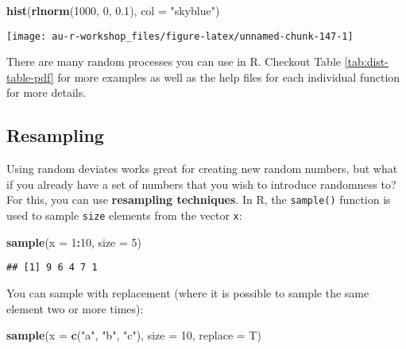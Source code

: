 \documentclass[]{book}
\newenvironment{Shaded}{\begin{snugshade}}{\end{snugshade}}
\newcommand{\KeywordTok}[1]{\textcolor[rgb]{0.13,0.29,0.53}{\textbf{#1}}}
\newcommand{\DataTypeTok}[1]{\textcolor[rgb]{0.13,0.29,0.53}{#1}}
\newcommand{\DecValTok}[1]{\textcolor[rgb]{0.00,0.00,0.81}{#1}}
\newcommand{\FloatTok}[1]{\textcolor[rgb]{0.00,0.00,0.81}{#1}}
\newcommand{\StringTok}[1]{\textcolor[rgb]{0.31,0.60,0.02}{#1}}
\newcommand{\OperatorTok}[1]{\textcolor[rgb]{0.81,0.36,0.00}{\textbf{#1}}}
\newcommand{\NormalTok}[1]{#1}
\theoremstyle{definition}
\theoremstyle{definition}
\theoremstyle{definition}
\theoremstyle{remark}
\begin{document}
\begin{Shaded}
\begin{Highlighting}[]
\KeywordTok{hist}\NormalTok{(}\KeywordTok{rlnorm}\NormalTok{(}\DecValTok{1000}\NormalTok{, }\DecValTok{0}\NormalTok{, }\FloatTok{0.1}\NormalTok{), }\DataTypeTok{col =} \StringTok{"skyblue"}\NormalTok{)}
\end{Highlighting}
\end{Shaded}

\begin{center}\texttt{[image: au-r-workshop\_files/figure-latex/unnamed-chunk-147-1]} \end{center}

There are many random processes you can use in R. Checkout Table
\ref{tab:dist-table-pdf} for more examples as well as the help files for
each individual function for more details.

\subsection{Resampling}\label{resampling}

Using random deviates works great for creating new random numbers, but
what if you already have a set of numbers that you wish to introduce
randomness to? For this, you can use \textbf{resampling techniques}. In
R, the \texttt{sample()} function is used to sample \texttt{size}
elements from the vector \texttt{x}:

\begin{Shaded}
\begin{Highlighting}[]
\KeywordTok{sample}\NormalTok{(}\DataTypeTok{x =} \DecValTok{1}\OperatorTok{:}\DecValTok{10}\NormalTok{, }\DataTypeTok{size =} \DecValTok{5}\NormalTok{)}
\end{Highlighting}
\end{Shaded}

\begin{verbatim}
## [1] 9 6 4 7 1
\end{verbatim}

You can sample with replacement (where it is possible to sample the same
element two or more times):

\begin{Shaded}
\begin{Highlighting}[]
\KeywordTok{sample}\NormalTok{(}\DataTypeTok{x =} \KeywordTok{c}\NormalTok{(}\StringTok{"a"}\NormalTok{, }\StringTok{"b"}\NormalTok{, }\StringTok{"c"}\NormalTok{), }\DataTypeTok{size =} \DecValTok{10}\NormalTok{, }\DataTypeTok{replace =}\NormalTok{ T)}
\end{Highlighting}
\end{Shaded}
\end{document}
